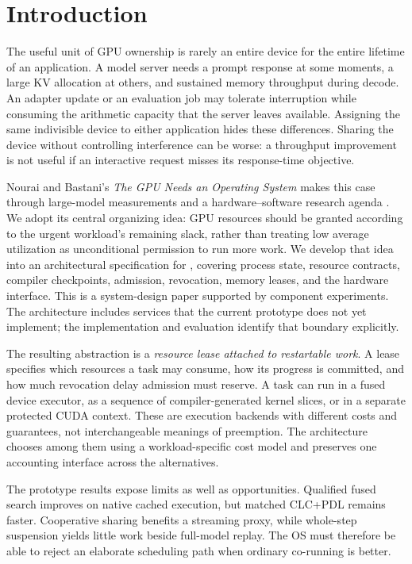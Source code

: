 \section{Introduction}
\label{sec:intro}
The useful unit of GPU ownership is rarely an entire device for the entire
lifetime of an application. A model server needs a prompt response at some
moments, a large KV allocation at others, and sustained memory throughput
during decode. An adapter update or an evaluation job may tolerate interruption
while consuming the arithmetic capacity that the server leaves available.
Assigning the same indivisible device to either application hides these
differences. Sharing the device without controlling interference can be worse:
a throughput improvement is not useful if an interactive request misses its
response-time objective.

Nourai and Bastani's \emph{The GPU Needs an Operating System} makes this case
through large-model measurements and a hardware--software research agenda
\cite{Nourai2026GPUOS}. We adopt its central organizing idea: GPU resources
should be granted according to the urgent workload's remaining slack, rather
than treating low average utilization as unconditional permission to run more
work. We develop that idea into an architectural specification for \system{},
covering process state, resource contracts, compiler checkpoints, admission,
revocation, memory leases, and the hardware interface. This is a system-design
paper supported by component experiments. The architecture includes services
that the current prototype does not yet implement; the implementation and
evaluation identify that boundary explicitly.

The resulting abstraction is a \emph{resource lease attached to restartable
work}. A lease specifies which resources a task may consume, how its progress
is committed, and how much revocation delay admission must reserve. A task can
run in a fused device executor, as a sequence of compiler-generated kernel
slices, or in a separate protected CUDA context. These are execution backends
with different costs and guarantees, not interchangeable meanings of
preemption. The architecture chooses among them using a workload-specific
cost model and preserves one accounting interface across the alternatives.

The prototype results expose limits as well as opportunities. Qualified
fused search improves on native cached execution, but matched CLC+PDL
remains faster. Cooperative sharing benefits a streaming proxy, while
whole-step suspension yields little work beside full-model replay.
The OS must therefore be able to reject an elaborate scheduling path
when ordinary co-running is better.

